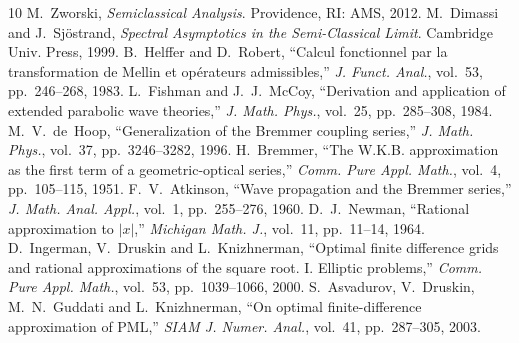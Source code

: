 \documentclass[11pt]{article}
\begin{document}
\begin{thebibliography}{10}
 M.~Zworski, \emph{Semiclassical Analysis}. Providence, RI: AMS, 2012.
 M.~Dimassi and J.~Sj\"ostrand, \emph{Spectral Asymptotics in the Semi-Classical Limit}. Cambridge Univ. Press, 1999.
 B.~Helffer and D.~Robert, ``Calcul fonctionnel par la transformation de Mellin et op\'erateurs admissibles,'' \emph{J. Funct. Anal.}, vol.~53, pp.~246--268, 1983.
 L.~Fishman and J.~J.~McCoy, ``Derivation and application of extended parabolic wave theories,'' \emph{J. Math. Phys.}, vol.~25, pp.~285--308, 1984.
 M.~V.~de~Hoop, ``Generalization of the Bremmer coupling series,'' \emph{J. Math. Phys.}, vol.~37, pp.~3246--3282, 1996.
 H.~Bremmer, ``The W.K.B. approximation as the first term of a geometric-optical series,'' \emph{Comm. Pure Appl. Math.}, vol.~4, pp.~105--115, 1951.
 F.~V.~Atkinson, ``Wave propagation and the Bremmer series,'' \emph{J. Math. Anal. Appl.}, vol.~1, pp.~255--276, 1960.
 D.~J.~Newman, ``Rational approximation to $|x|$,'' \emph{Michigan Math. J.}, vol.~11, pp.~11--14, 1964.
 D.~Ingerman, V.~Druskin and L.~Knizhnerman, ``Optimal finite difference grids and rational approximations of the square root. I. Elliptic problems,'' \emph{Comm. Pure Appl. Math.}, vol.~53, pp.~1039--1066, 2000.
 S.~Asvadurov, V.~Druskin, M.~N.~Guddati and L.~Knizhnerman, ``On optimal finite-difference approximation of PML,'' \emph{SIAM J. Numer. Anal.}, vol.~41, pp.~287--305, 2003.
\end{thebibliography}
\end{document}
